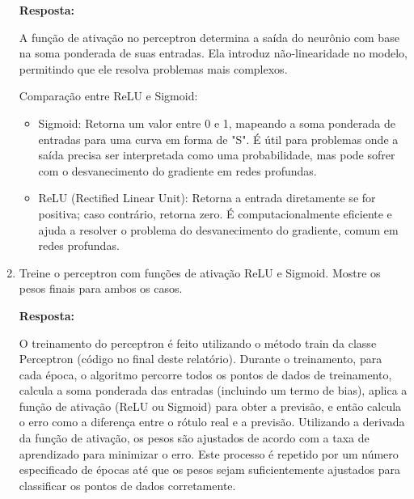 \documentclass[12 pt]{article}
\begin{document}
\begin{enumerate}
    \textbf{Resposta:} \par

    A função de ativação no perceptron determina a saída do neurônio com base na soma ponderada de suas entradas. Ela introduz não-linearidade no modelo, permitindo que ele resolva problemas mais complexos.

    Comparação entre ReLU e Sigmoid:

    \begin{itemize}
        \item Sigmoid: Retorna um valor entre 0 e 1, mapeando a soma ponderada de entradas para uma curva em forma de "S". É útil para problemas onde a saída precisa ser interpretada como uma probabilidade, mas pode sofrer com o desvanecimento do gradiente em redes profundas.
        \item ReLU (Rectified Linear Unit): Retorna a entrada diretamente se for positiva; caso contrário, retorna zero. É computacionalmente eficiente e ajuda a resolver o problema do desvanecimento do gradiente, comum em redes profundas.
    \end{itemize}
    
    \item Treine o perceptron com funções de ativação ReLU e Sigmoid. Mostre os pesos finais para ambos os casos.\par

    \textbf{Resposta:} \par
    
    O treinamento do perceptron é feito utilizando o método train da classe Perceptron (código no final deste relatório). Durante o treinamento, para cada época, o algoritmo percorre todos os pontos de dados de treinamento, calcula a soma ponderada das entradas (incluindo um termo de bias), aplica a função de ativação (ReLU ou Sigmoid) para obter a previsão, e então calcula o erro como a diferença entre o rótulo real e a previsão. Utilizando a derivada da função de ativação, os pesos são ajustados de acordo com a taxa de aprendizado para minimizar o erro. Este processo é repetido por um número especificado de épocas até que os pesos sejam suficientemente ajustados para classificar os pontos de dados corretamente.


\end{enumerate}
\end{document}
